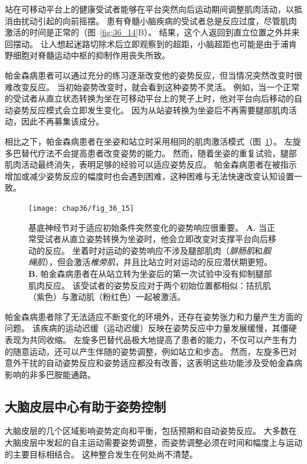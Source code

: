 站在可移动平台上的健康受试者能够在平台突然向后运动期间调整肌肉活动，以抵消由扰动引起的向前摇摆。
患有脊髓小脑疾病的受试者总是反应过度，尽管肌肉激活的时间是正常的（图~\ref{fig:36_14}B）。
结果，这个人返回到直立位置之外并来回摆动。
让人想起迷路切除术后立即观察到的超距，小脑超距也可能是由于浦肯野细胞对脊髓运动中枢的抑制作用丧失所致。


帕金森病患者可以通过充分的练习逐渐改变他的姿势反应，但当情况突然改变时很难改变反应。
当初始姿势改变时，就会看到这种姿势不灵活。
例如，当一个正常的受试者从直立状态转换为坐在可移动平台上的凳子上时，他对平台向后移动的自动姿势反应模式会立即发生变化。
因为从站姿转换为坐姿后不再需要腿部肌肉活动，因此不再募集该成分。


相比之下，帕金森病患者在坐姿和站立时采用相同的肌肉激活模式（图~\ref{fig:36_15}）。
左旋多巴替代疗法不会提高患者改变姿势的能力。
然而，随着坐姿的重复试验，腿部肌肉活动最终消失，表明足够的经验可以适应姿势反应。
帕金森病患者在被指示增加或减少姿势反应的幅度时也会遇到困难，这种困难与无法快速改变认知设置一致。


\begin{figure}[htbp]
	\centering
	\texttt{[image: chap36/fig\_36\_15]}
	\caption{基底神经节对于适应初始条件突然变化的姿势响应很重要\cite{horak1992postural}。
		\textbf{A.} 当正常受试者从直立姿势转换为坐姿时，他会立即改变对支撑平台向后移动的反应。
		坐着时对运动的姿势响应不涉及腿部肌肉（\textit{腓肠肌}和\textit{腘绳肌}），但会激活\textit{椎旁肌}，并且比站立时对运动的反应潜伏期更短。
		\textbf{B.} 帕金森病患者在从站立转为坐姿后的第一次试验中没有抑制腿部肌肉反应。
		该受试者的姿势反应对于两个初始位置都相似：拮抗肌（紫色）与激动肌（粉红色）一起被激活。}
	\label{fig:36_15}
\end{figure}


帕金森病患者除了无法适应不断变化的环境外，还存在姿势张力和力量产生方面的问题。
该疾病的运动迟缓（运动迟缓）反映在姿势反应中力量发展缓慢，其僵硬表现为共同收缩。
左旋多巴替代品极大地提高了患者的能力，不仅可以产生有力的随意运动，还可以产生伴随的姿势调整，例如站立和步态。
然而，左旋多巴对意外干扰的自动姿势反应和姿势适应都没有改善，这表明这些功能涉及受帕金森病影响的非多巴胺能通路。



\subsection{大脑皮层中心有助于姿势控制}

大脑皮层的几个区域影响姿势定向和平衡，包括预期和自动姿势反应。
大多数在大脑皮层中发起的自主运动需要姿势调整，而姿势调整必须在时间和幅度上与运动的主要目标相结合。
这种整合发生在何处尚不清楚。



